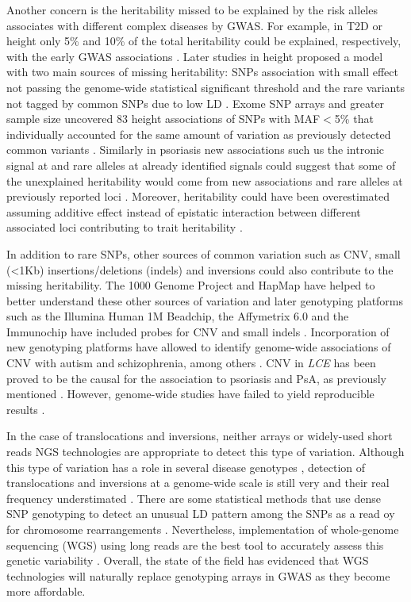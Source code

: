 Another concern is the heritability missed to be explained by the risk alleles associates with different complex diseases by GWAS. For example, in T2D or height only 5\% and 10\% of the total heritability could be explained, respectively, with the early GWAS associations \parencite{Ku2010, Yang2010}. Later studies in height proposed a model with two main sources of missing heritability: SNPs association with small effect not passing the genome-wide statistical significant threshold and the rare variants not tagged by common SNPs due to low LD \parencite{Yang2010}. Exome SNP arrays and greater sample size uncovered 83 height associations of SNPs with MAF${<}$5\% that individually accounted for the same amount of variation as previously detected common variants \parencite{Marouli2017}. Similarly in psoriasis new associations such us the intronic signal at \parencite{TNFSF15} and rare alleles at already identified signals could suggest that some of the unexplained heritability would come from new associations and rare alleles at previously reported loci \parencite{Dand2017.}. Moreover, heritability could have been overestimated assuming additive effect instead of epistatic interaction between different associated loci contributing to trait heritability \parencite{Zuk2012}.

In addition to rare SNPs, other sources of common variation such as CNV, small (<1Kb) insertions/deletions (indels) and inversions could also contribute to the missing heritability. The 1000 Genome Project and HapMap have helped to better understand these other sources of variation and later genotyping platforms such as the Illumina Human 1M Beadchip, the Affymetrix 6.0 and the Immunochip have included probes for CNV and small indels \parencite{Ku2010}. Incorporation of new genotyping platforms have allowed to identify genome-wide associations of CNV with autism and schizophrenia, among others \parencite{Glessner2009,Marshall2017}. CNV in \textit{LCE} has been proved to be the causal for the association to psoriasis and PsA, as previously mentioned \parencite{Cid2009}. However, genome-wide studies have failed to yield reproducible results \parencite{Uebe2017}.

In the case of translocations and inversions, neither arrays or widely-used short reads NGS technologies are appropriate to detect this type of variation. Although this type of variation has a role in several disease genotypes \parencite{Feuk2010}, detection of  translocations and inversions at a genome-wide scale is still very and their real frequency understimated \parencite{Ku2010}. There are some statistical methods that use dense SNP genotyping to detect an unusual LD pattern among the SNPs as a read oy for chromosome rearrangements \parencite{Bansal2007}. Nevertheless, implementation of whole-genome sequencing (WGS) using long reads are the best tool to accurately assess this genetic variability \parencite{Visscher2017}. Overall, the state of the field has evidenced that WGS technologies will naturally replace genotyping arrays in GWAS as they become more affordable.
 

